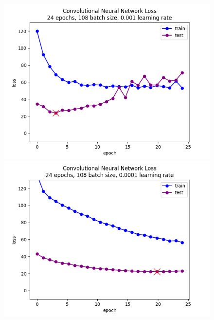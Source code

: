\documentclass[10pt,twocolumn,letterpaper]{article}
\begin{document}
\begin{figure}[h]
   \begin{center}
       \includegraphics[width=\linewidth]{graphs/CNN/higher_learning_rate_loss_plot.png}
        \includegraphics[width=\linewidth]{graphs/CNN/loss_plot.png}
   \end{center}
        \vspace*{-6mm}
        \caption{\label{sixth_figure}}
\end{figure}

\end{document}
